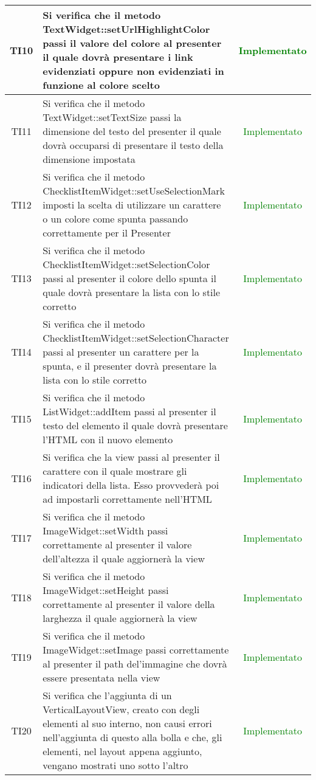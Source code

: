 \begin{center}
\begin{longtable}{|c|>{\centering}m{10cm}|c|}
		TI10 & Si verifica che il metodo TextWidget::setUrlHighlightColor passi il valore del colore al presenter il quale dovrà presentare i link evidenziati oppure non evidenziati in funzione al colore scelto & \textcolor{Green}{Implementato}\\ \hline
		TI11 & Si verifica che il metodo TextWidget::setTextSize passi la dimensione del testo del presenter il quale dovrà occuparsi di presentare il testo della dimensione impostata & \textcolor{Green}{Implementato}\\ \hline
		TI12 & Si verifica che il metodo ChecklistItemWidget::setUseSelectionMark imposti la scelta di utilizzare un carattere o un colore come spunta passando correttamente per il Presenter & \textcolor{Green}{Implementato}\\ \hline
		TI13 & Si verifica che il metodo ChecklistItemWidget::setSelectionColor passi al presenter il colore dello spunta il quale dovrà presentare la lista con lo stile corretto & \textcolor{Green}{Implementato}\\ \hline
		TI14 & Si verifica che il metodo ChecklistItemWidget::setSelectionCharacter passi al presenter un carattere per la spunta, e il presenter dovrà presentare la lista con lo stile corretto & \textcolor{Green}{Implementato}\\ \hline
		TI15 & Si verifica che il metodo ListWidget::addItem passi al presenter il testo del elemento il quale dovrà presentare l'HTML con il nuovo elemento & \textcolor{Green}{Implementato}\\ \hline
		TI16 & Si verifica che la view passi al presenter il carattere con il quale mostrare gli indicatori della lista. Esso provvederà poi ad impostarli correttamente nell'HTML & \textcolor{Green}{Implementato}\\ \hline
		TI17 & Si verifica che il metodo ImageWidget::setWidth passi correttamente al presenter il valore dell'altezza il quale aggiornerà la view & \textcolor{Green}{Implementato}\\ \hline
		TI18 & Si verifica che il metodo ImageWidget::setHeight passi correttamente al presenter il valore della larghezza il quale aggiornerà la view & \textcolor{Green}{Implementato}\\ \hline
		TI19 & Si verifica che il metodo ImageWidget::setImage passi correttamente al presenter il path del'immagine che dovrà essere presentata nella view & \textcolor{Green}{Implementato}\\ \hline
		TI20 & Si verifica che l'aggiunta di un VerticalLayoutView, creato con degli elementi al suo interno, non causi errori nell'aggiunta di questo alla bolla e che, gli elementi, nel layout appena aggiunto, vengano mostrati uno sotto l'altro & \textcolor{Green}{Implementato}\\ \hline

\end{longtable}
\end{center}

